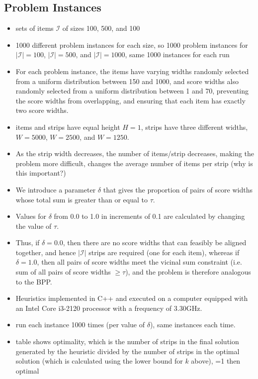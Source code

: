 \documentclass[oribibl]{llncs}
\begin{document}
\subsection{Problem Instances}
\begin{itemize}
	\item sets of items $\mathcal{I}$ of sizes 100, 500, and 100
	\item 1000 different problem instances for each size, so 1000 problem instances for $|\mathcal{I}| = 100$, $|\mathcal{I}| = 500$, and $|\mathcal{I}| = 1000$, same 1000 instances for each run
	\item For each problem instance, the items have varying widths randomly selected from a uniform distribution between 150 and 1000, and score widths also randomly selected from a uniform distribution between 1 and 70, preventing the score widths from overlapping, and ensuring that each item has exactly two score widths.
	\item items and strips have equal height $H = 1$, strips have three different widths, $W = 5000$, $W = 2500$, and $W = 1250$. 
	\item As the strip width decreases, the number of items/strip decreases, making the problem more difficult, changes the average number of items per strip (why is this important?)
	\item We introduce a parameter $\delta$ that gives the proportion of pairs of score widths whose total sum is greater than or equal to $\tau$. 
	\item Values for $\delta$ from 0.0 to 1.0 in increments of 0.1 are calculated by changing the value of $\tau$. 
	\item Thus, if $\delta  = 0.0$, then there are no score widths that can feasibly be aligned together, and hence $|\mathcal{I}|$ strips are required (one for each item), whereas if $\delta = 1.0$, then all pairs of score widths meet the vicinal sum constraint (i.e. sum of all pairs of score widths $\geq \tau$), and the problem is therefore analogous to the BPP. 
	\item Heuristics implemented in C++ and executed on a computer equipped with an Intel Core i3-2120 processor with a frequency of 3.30GHz.
	\item run each instance 1000 times (per value of $\delta$), same instances each time.
	\item table shows optimality, which is the number of strips in the final solution generated by the heuristic divided by the number of strips in the optimal solution (which is calculated using the lower bound for $k$ above), =1 then optimal

\end{itemize}
\end{document}
